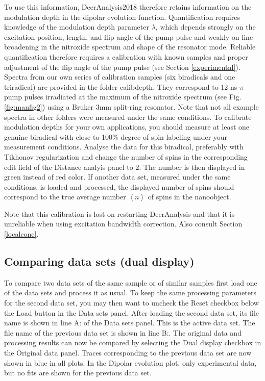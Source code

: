 \documentclass{article}
\begin{document}
To use this information, DeerAnalysis2018
therefore retains information on the modulation depth in the dipolar evolution function. Quantification requires knowledge of the modulation depth parameter $\lambda$, which depends strongly on the excitation position, length, and flip angle of the pump pulse and weakly on line broadening
in the nitroxide spectrum and shape of the resonator mode. Reliable
quantification therefore requires a calibration with known samples and proper
adjustment of the flip angle of the pump pulse (see Section \ref{experimental}). Spectra from our own
series of calibration samples (six biradicals and one triradical) are provided in
the folder calibdepth. They correspond to 12 ns $\pi$ pump pulses irradiated at the
maximum of the nitroxide spectrum (see Fig. \ref{fig:manfig2}) using a Bruker 3mm split-ring
resonator. Note that not all example spectra in other folders were measured
under the same conditions. To calibrate modulation depths for your own applications,
you should measure at least one genuine biradical with close to 100\%
degree of spin-labeling under your measurement conditions. Analyse the data for this biradical, preferably with Tikhonov regularization and change the number of spins in the corresponding edit field of the {\ttfamily Distance analyis} panel to 2. The number is then displayed in green instead of red color. If another data set, measured under the same conditions, is loaded and processed, the displayed number of spins should correspond to the true average number $\left\langle n \right\rangle$ of spins in the nanoobject.

Note that this calibration is lost on restarting DeerAnalysis and that it is unreliable when using excitation bandwidth correction. Also consult Section \ref{localconc}.

\subsection{Comparing data sets (dual display)}
\label{dual_display}
To compare two data sets of the same sample or of similar samples first load one of the data sets and process it as usual. To keep the same processing parameters for the second data set, you may then want to uncheck the {\ttfamily Reset} checkbox below the {\ttfamily Load} button in the {\ttfamily Data sets} panel. After loading the second data set, its file name is shown in line {\ttfamily A:} of the {\ttfamily Data sets} panel. This is the active data set. The file name of the previous data set is shown in line {\ttfamily B:}. The original data and processing results can now be compared by selecting the {\ttfamily Dual display} checkbox in the {\ttfamily Original data} panel. Traces corresponding to the previous data set are now shown in blue in all plots. In the {\ttfamily Dipolar evolution} plot, only experimental data, but no fits are shown for the previous data set.
\end{document}
